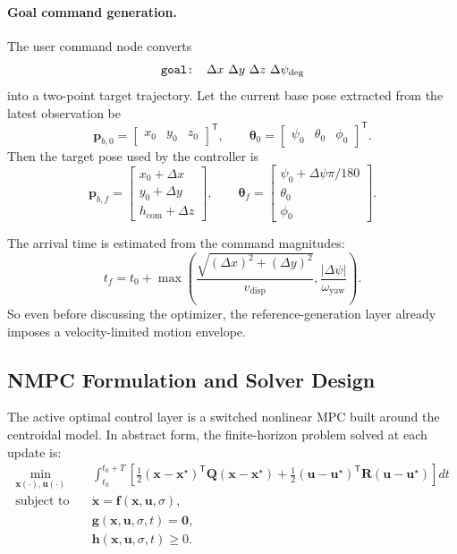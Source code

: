 \documentclass[11pt,a4paper]{article}
\newcommand{\vect}[1]{\boldsymbol{#1}}
\newcommand{\mat}[1]{\mathbf{#1}}
\newcommand{\trans}{^{\mathsf T}}
\newcommand{\code}[1]{\texttt{#1}}
\begin{document}
\paragraph{Goal command generation.}
The user command node converts
\[
\text{\code{goal: }}\Delta x\ \Delta y\ \Delta z\ \Delta \psi_{\deg}
\]
into a two-point target trajectory. Let the current base pose extracted from the latest observation be
\begin{equation}
\vect{p}_{b,0} = \begin{bmatrix} x_0 & y_0 & z_0 \end{bmatrix}\trans, \qquad
\vect{\theta}_{0} = \begin{bmatrix} \psi_0 & \theta_0 & \phi_0 \end{bmatrix}\trans.
\end{equation}
Then the target pose used by the controller is
\begin{equation}
\vect{p}_{b,f} =
\begin{bmatrix}
x_0 + \Delta x \\
y_0 + \Delta y \\
h_{\mathrm{com}} + \Delta z
\end{bmatrix},
\qquad
\vect{\theta}_{f} =
\begin{bmatrix}
\psi_0 + \Delta \psi \pi / 180 \\
\theta_0 \\
\phi_0
\end{bmatrix}.
\end{equation}

The arrival time is estimated from the command magnitudes:
\begin{equation}
t_f = t_0 +
\max\left(
\frac{\sqrt{(\Delta x)^2 + (\Delta y)^2}}{v_{\mathrm{disp}}},
\frac{|\Delta \psi|}{\omega_{\mathrm{yaw}}}
\right).
\end{equation}
So even before discussing the optimizer, the reference-generation layer already imposes a velocity-limited motion envelope.

\subsection{NMPC Formulation and Solver Design}

The active optimal control layer is a switched nonlinear MPC built around the centroidal model. In abstract form, the finite-horizon
problem solved at each update is:
\begin{align}
\min_{\vect{x}(\cdot),\vect{u}(\cdot)} \quad &
\int_{t_0}^{t_0+T}
\left[
\frac{1}{2}\left(\vect{x}-\vect{x}^{\star}\right)\trans \mat{Q}\left(\vect{x}-\vect{x}^{\star}\right) +
\frac{1}{2}\left(\vect{u}-\vect{u}^{\star}\right)\trans \mat{R}\left(\vect{u}-\vect{u}^{\star}\right)
\right]dt \\
\text{subject to} \quad &
\dot{\vect{x}} = \vect{f}(\vect{x},\vect{u},\sigma), \\
& \vect{g}(\vect{x},\vect{u},\sigma,t) = \vect{0}, \\
& \vect{h}(\vect{x},\vect{u},\sigma,t) \ge 0.
\end{align}
\end{document}
